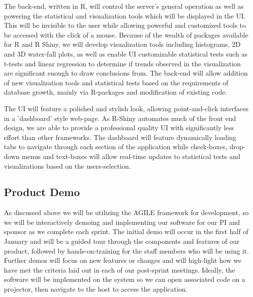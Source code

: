 \documentclass[10pt,twocolumn,letterpaper]{article}
\begin{document}
            The back-end, written in R, will control the server's general operation as well as powering the statistical and visualization tools which will be displayed in the UI. 
	    This will be invisible to the user while allowing powerful and customized tools to be accessed with the click of a mouse. 
	    Because of the wealth of packages available for R and R Shiny, we will develop visualization tools including histograms, 2D and 3D water-fall plots, as well as enable UI 
	    customizable statistical tests such as t-tests and linear regression to determine if trends observed in the visualization are significant enough to draw conclusions from. 
	    The back-end will allow addition of new visualization tools and statistical tests based on the requirements of database growth, mainly via R-packages and modification of 
	    existing code.


            The UI will feature a polished and stylish look, allowing point-and-click interfaces in a 'dashboard' style web-page. 
	    As R-Shiny automates much of the front end design, we are able to provide a professional quality UI with significantly less effort than other frameworks. 
	    The dashboard will feature dynamically loading tabs to navigate through each section of the application while check-boxes, drop-down menus and text-boxes will allow real-time
	    updates to statistical tests and visualizations based on the users-selection.

            \subsection{Product Demo}

            As discussed above we will be utilizing the AGILE framework for development, so we will be interactively demoing and implementing our software for our PI and sponsor as we complete each sprint. The initial demo will occur in the first half of January and will be a guided tour through the components and features of our product, followed by hands-on-training for the staff members who will be using it. Further demos will focus on new features or changes and will high-light how we have met the criteria laid out in each of our post-sprint meetings. Ideally, the software will be implemented on the system so we can open associated code on a projector, then navigate to the host to access the application.
\end{document}
